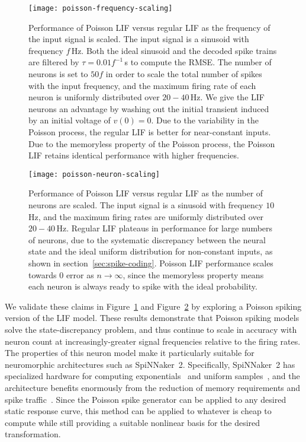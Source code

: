 \begin{figure}
\centering
\texttt{[image: poisson-frequency-scaling]}
\caption{\label{fig:poisson-frequency-scaling} Performance of Poisson LIF versus regular LIF as the frequency of the input signal is scaled.
The input signal is a sinusoid with frequency $f$\,Hz.
Both the ideal sinusoid and the decoded spike trains are filtered by $\tau = 0.01 f^{-1}$\,s to compute the RMSE.
The number of neurons is set to $50 f$ in order to scale the total number of spikes with the input frequency, and the maximum firing rate of each neuron is uniformly distributed over $20-40$\,Hz.
We give the LIF neurons an advantage by washing out the initial transient induced by an initial voltage of $v(0) = 0$.
Due to the variability in the Poisson process, the regular LIF is better for near-constant inputs.
Due to the memoryless property of the Poisson process, the Poisson LIF retains identical performance with higher frequencies.
}
\end{figure}

\begin{figure}
\centering
\texttt{[image: poisson-neuron-scaling]}
\caption{\label{fig:poisson-neuron-scaling} Performance of Poisson LIF versus regular LIF as the number of neurons are scaled.
The input signal is a sinusoid with frequency $10$\,Hz, and the maximum firing rates are uniformly distributed over $20-40$\,Hz.
Regular LIF plateaus in performance for large numbers of neurons, due to the systematic discrepancy between the neural state and the ideal uniform distribution for non-constant inputs, as shown in section~\ref{sec:spike-coding}.
Poisson LIF performance scales towards $0$ error as $n \rightarrow \infty$, since the memoryless property means each neuron is always ready to spike with the ideal probability. 
}
\end{figure}

We validate these claims in Figure~\ref{fig:poisson-frequency-scaling} and Figure~\ref{fig:poisson-neuron-scaling} by exploring a Poisson spiking version of the LIF model.
These results demonstrate that Poisson spiking models solve the state-discrepancy problem, and thus continue to scale in accuracy with neuron count at increasingly-greater signal frequencies relative to the firing rates.
The properties of this neuron model make it particularly suitable for neuromorphic architectures such as SpiNNaker~2.
Specifically, SpiNNaker~2 has specialized hardware for computing exponentials~\citep{partzsch2017fixed} and uniform samples~\citep{liu2018memory}, and the architecture benefits enormously from the reduction of memory requirements and spike traffic~\citep{mundy2015, stromatias2013power}.
Since the Poisson spike generator can be applied to any desired static response curve, this method can be applied to whatever is cheap to compute while still providing a suitable nonlinear basis for the desired transformation.

